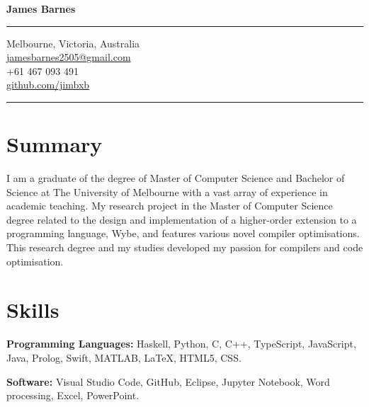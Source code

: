 \documentclass[9pt]{extarticle}
\newcommand{\skills}[2]{
    \textbf{#1} \newline
    #2
}
\begin{document}
\pagestyle{empty} 

\begin{minipage}[t]{.31\textwidth}
\vspace*{0pt}

\begin{center}
{\huge \bfseries James Barnes\par}
\end{center}

\bigskip
\hrule
\bigskip

\begin{center}
Melbourne, Victoria, Australia \\
\href{mailto:jamesbarnes2505@gmail.com}{jamesbarnes2505@gmail.com} \\
+61 467 093 491 \\
\href{http://github.com/jimbxb}{github.com/jimbxb}
\end{center}

\bigskip
\hrule
\bigskip

\section{Summary}

\begin{flushleft}
I am a graduate of the degree of Master of Computer Science and Bachelor of Science at 
The University of Melbourne with a vast array of experience in academic teaching. 
My research project in the Master of Computer Science degree related to the design and implementation 
of a higher-order extension to a programming language, Wybe, and features various novel compiler optimisations.
This research degree and my studies developed my passion for compilers and code optimisation.
\end{flushleft} 

\medskip

\section{Skills}

\skills{Programming Languages:}
{Haskell, Python, C, C++, TypeScript, JavaScript, Java, Prolog, Swift, MATLAB, {\fontfamily{cmr}\selectfont \LaTeX{}}, HTML5, CSS. \newline }

\skills{Software:}
{Visual Studio Code, GitHub, Eclipse, Jupyter Notebook, Word processing, Excel, PowerPoint. \newline }


\end{minipage}
\end{document}
